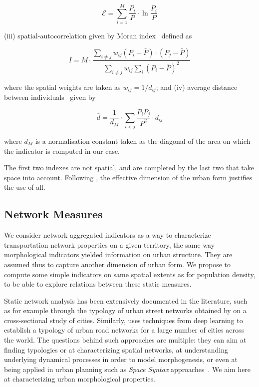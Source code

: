 \documentclass[11pt]{article}
\begin{document}
\begin{equation}
\mathcal{E} = \sum_{i=1}^{M}\frac{P_i}{P}\cdot \ln{\frac{P_i}{P}}
\end{equation}
 
(iii) spatial-autocorrelation given by Moran index~\citep{tsai2005quantifying} defined as

\begin{equation}
I = M \cdot \frac{\sum_{i\neq j} w_{ij} \left(P_i - \bar{P}\right)\cdot\left(P_j - \bar{P}\right)}{\sum_{i\neq j} w_{ij} \sum_{i}{\left( P_i - \bar{P}\right)}^2}
\end{equation}

where the spatial weights are taken as $w_{ij} = 1/d_{ij}$; and (iv) average distance between individuals~\citep{le2009quantifier} given by

\begin{equation}
\bar{d} = \frac{1}{d_M}\cdot \sum_{i<j} \frac{P_i P_j}{P^2} \cdot d_{ij}
\end{equation}

where $d_M$ is a normalisation constant taken as the diagonal of the area on which the indicator is computed in our case.

The first two indexes are not spatial, and are completed by the last two that take space into account. Following \cite{Schwarz201029}, the effective dimension of the urban form justifies the use of all.


\subsection{Network Measures}


We consider network aggregated indicators as a way to characterize transportation network properties on a given territory, the same way morphological indicators yielded information on urban structure. They are assumed thus to capture another dimension of urban form. We propose to compute some simple indicators on same spatial extents as for population density, to be able to explore relations between these static measures.

Static network analysis has been extensively documented in the literature, such as for example through the typology of urban street networks obtained by \cite{louf2014typology} on a cross-sectional study of cities. Similarly, \cite{2017arXiv170902939M} uses techniques from deep learning to establish a typology of urban road networks for a large number of cities across the world. The questions behind such approaches are multiple: they can aim at finding typologies or at characterizing spatial networks, at understanding underlying dynamical processes in order to model morphogenesis, or even at being applied in urban planning such as \emph{Space Syntax} approaches~\citep{hillier1989social}. We aim here at characterizing urban morphological properties.
\end{document}
